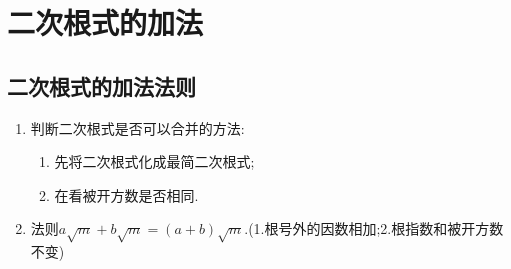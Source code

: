 \chapter{二次根式的加法}
\section{二次根式的加法法则}
\begin{enumerate}
    \item  判断二次根式是否可以合并的方法:\begin{enumerate}
        \item 先将二次根式化成最简二次根式;
        \item 在看被开方数是否相同.
    \end{enumerate}
    \item 法则$a\sqrt{m}+b\sqrt{m}=(a+b)\sqrt{m}$.(1.根号外的因数相加;2.根指数和被开方数不变) 
\end{enumerate}
